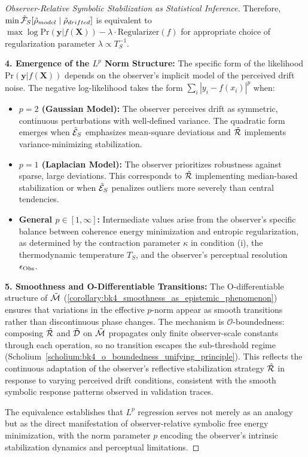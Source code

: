 \begin{proof}[Observer-Relative Symbolic Stabilization as Statistical Inference]
Therefore, $\min \tilde{\mathcal{F}}_S[\tilde{\rho}_{model} \mid \tilde{\rho}_{drifted}]$ is equivalent to $\max \log \mathrm{Pr}(\mathbf{y} | f(\mathbf{X})) - \lambda \cdot \text{Regularizer}(f)$ for appropriate choice of regularization parameter $\lambda \propto T_S^{-1}$.

\textbf{4. Emergence of the $L^p$ Norm Structure:} The specific form of the likelihood $\mathrm{Pr}(\mathbf{y} | f(\mathbf{X}))$ depends on the observer's implicit model of the perceived drift noise. The negative log-likelihood takes the form $\sum_i \left|y_i - f(x_i)\right|^p$ when:
\begin{itemize}
    \item \textbf{$p=2$ (Gaussian Model):} The observer perceives drift as symmetric, continuous perturbations with well-defined variance. The quadratic form emerges when $\tilde{\mathcal{E}}_S$ emphasizes mean-square deviations and $\tilde{\mathcal{R}}$ implements variance-minimizing stabilization.
    \item \textbf{$p=1$ (Laplacian Model):} The observer prioritizes robustness against sparse, large deviations. This corresponds to $\tilde{\mathcal{R}}$ implementing median-based stabilization or when $\tilde{\mathcal{E}}_S$ penalizes outliers more severely than central tendencies.
    \item \textbf{General $p \in [1,\infty]$:} Intermediate values arise from the observer's specific balance between coherence energy minimization and entropic regularization, as determined by the contraction parameter $\kappa$ in condition (i), the thermodynamic temperature $T_S$, and the observer's perceptual resolution $\epsilon_{\mathrm{Obs}}$.
\end{itemize}

\textbf{5. Smoothness and O-Differentiable Transitions:} The O-differentiable structure of $\tilde{\mathcal{M}}$ (\ref{corollary:bk4_smoothness_as_epistemic_phenomenon}) ensures that variations in the effective $p$-norm appear as smooth transitions rather than discontinuous phase changes. The mechanism is $\mathcal{O}$-boundedness: composing $\tilde{\mathcal{R}}$ and $\tilde{\mathcal{D}}$ on $\tilde{\mathcal{M}}$ propagates only finite observer-scale constants through each operation, so no transition escapes the sub-threshold regime (Scholium~\ref{scholium:bk4_o_boundedness_unifying_principle}). This reflects the continuous adaptation of the observer's reflective stabilization strategy $\tilde{\mathcal{R}}$ in response to varying perceived drift conditions, consistent with the smooth symbolic response patterns observed in validation traces.

The equivalence establishes that $L^p$ regression serves not merely as an analogy but as the direct manifestation of observer-relative symbolic free energy minimization, with the norm parameter $p$ encoding the observer's intrinsic stabilization dynamics and perceptual limitations.
\end{proof}

